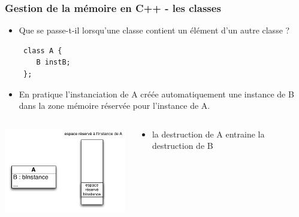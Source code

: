 \begin{frame}[fragile]\frametitle{Gestion de la mémoire en C++ - les classes}

\begin{itemize}
\itemsep1pt\parskip0pt
\item
  Que se passe-t-il lorsqu'une classe contient un élément d'un autre
  classe ?
\begin{lstlisting}
 class A {
 	B instB;
 };
\end{lstlisting}
\item
  En pratique l'instanciation de A créée automatiquement une instance de
  B dans la zone mémoire réservée pour l'instance de A.
\end{itemize}
\begin{columns}
\begin{column}{.6\textwidth}
\includegraphics[width=6cm]{fig/inclusion-classe.pdf}
\end{column}
\begin{column}{.39\textwidth}
\begin{itemize}
\itemsep1pt\parskip0pt
\item
  la destruction de A entraine la destruction de B
\end{itemize}
\end{column}
\end{columns}
\end{frame}


